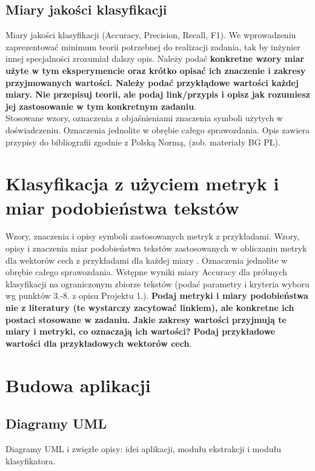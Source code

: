 \documentclass{classrep}
\begin{document}
\subsection{Miary jakości klasyfikacji} 
Miary jakości klasyfikacji (Accuracy, Precision,
Recall, F1). We wprowadzeniu zaprezentować minimum teorii potrzebnej do realizacji
zadania, tak by inżynier innej specjalności zrozumiał dalszy opis. Należy podać {\bf konkretne wzory miar użyte w tym eksperymencie oraz krótko
opisać ich znaczenie i zakresy przyjmowanych wartości. Należy podać przykłądowe
wartości każdej miary. Nie przepisuj
teorii, ale podaj link/przypis i opisz jak rozumiesz jej zastosowanie w tym konkretnym
zadaniu}. \\
\indent Stosowane wzory, oznaczenia z objaśnieniami znaczenia symboli użytych w
doświadczeniu. Oznaczenia jednolite w obrębie całego sprawozdania.  Opis zawiera przypisy do bibliografii zgodnie z
Polską Normą, (zob. materiały BG PŁ).\\


\section{Klasyfikacja z użyciem metryk i miar podobieństwa tekstów}
Wzory, znaczenia i opisy symboli zastosowanych metryk z
przykładami. Wzory, opisy i znaczenia miar
podobieństwa tekstów zastosowanych w obliczaniu metryk dla wektorów cech z
przykładami dla każdej miary \cite{niewiadomski08}.  Oznaczenia jednolite w obrębie całego sprawozdania.  Wstępne wyniki miary Accuracy dla próbnych klasyfikacji na ograniczonym zbiorze tekstów (podać parametry i kryteria
wyboru wg punktów 3.-8. z opisu Projektu 1.). {\bf Podaj metryki i miary
podobieństwa nie z literatury (te wystarczy zacytować linkiem), ale konkretne ich
postaci stosowane w zadaniu. Jakie zakresy wartości przyjmują te miary i
metryki, co oznaczają ich wartości? Podaj przykładowe wartości dla przykładowych wektorów cech}. \\ 

\section{Budowa aplikacji}
\subsection{Diagramy UML}
Diagramy UML i zwięzłe opisy: idei aplikacji, modułu ekstrakcji i modułu
klasyfikatora.\\
\end{document}
